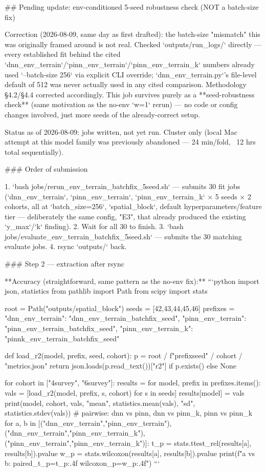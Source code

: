 ## Pending update: env-conditioned 5-seed robustness check (NOT a batch-size fix)

Correction (2026-08-09, same day as first drafted): the batch-size "mismatch" this was originally
framed around is not real. Checked `outputs/run_logs/` directly — every established fit behind the
cited `dnn_env_terrain`/`pinn_env_terrain`/`pinn_env_terrain_k` numbers already used
`--batch-size 256` via explicit CLI override; `dnn_env_terrain.py`'s file-level default of 512 was
never actually used in any cited comparison. Methodology §4.2/§4.4 corrected accordingly. This job
survives purely as a **seed-robustness check** (same motivation as the no-env `w=1` rerun) — no
code or config changes involved, just more seeds of the already-correct setup.

Status as of 2026-08-09: jobs written, not yet run. Cluster only (local Mac attempt at this
model family was previously abandoned — 24 min/fold, ~12 hrs total sequentially).

### Order of submission

1. `bash jobs/rerun_env_terrain_batchfix_5seed.sh` — submits 30 fit jobs
   (`dnn_env_terrain`, `pinn_env_terrain`, `pinn_env_terrain_k` × 5 seeds × 2 cohorts,
   all at `batch_size=256`, `spatial_block`, default hyperparameters/feature tier — deliberately
   the same config, "E3", that already produced the existing `y_max`/`k` finding).
2. Wait for all 30 to finish.
3. `bash jobs/evaluate_env_terrain_batchfix_5seed.sh` — submits the 30 matching evaluate jobs.
4. rsync `outputs/` back.

### Step 2 — extraction after rsync

**Accuracy (straightforward, same pattern as the no-env fix):**
```python
import json, statistics
from pathlib import Path
from scipy import stats

root = Path("outputs/spatial_block")
seeds = [42,43,44,45,46]
prefixes = {"dnn_env_terrain": "dnn_env_terrain_batchfix_seed",
            "pinn_env_terrain": "pinn_env_terrain_batchfix_seed",
            "pinn_env_terrain_k": "pinnk_env_terrain_batchfix_seed"}

def load_r2(model, prefix, seed, cohort):
    p = root / f"{prefix}{seed}" / cohort / "metrics.json"
    return json.loads(p.read_text())["r2"] if p.exists() else None

for cohort in ["4survey", "6survey"]:
    results = {}
    for model, prefix in prefixes.items():
        vals = [load_r2(model, prefix, s, cohort) for s in seeds]
        results[model] = vals
        print(model, cohort, vals, "mean", statistics.mean(vals), "sd", statistics.stdev(vals))
    # pairwise: dnn vs pinn, dnn vs pinn_k, pinn vs pinn_k
    for a, b in [("dnn_env_terrain","pinn_env_terrain"), ("dnn_env_terrain","pinn_env_terrain_k"),
                 ("pinn_env_terrain","pinn_env_terrain_k")]:
        t_p = stats.ttest_rel(results[a], results[b]).pvalue
        w_p = stats.wilcoxon(results[a], results[b]).pvalue
        print(f"{a} vs {b}: paired_t_p={t_p:.4f} wilcoxon_p={w_p:.4f}")
```

